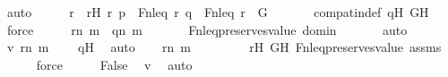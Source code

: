 \begin{isabellebody}
\ auto\isanewline
\ \ \isamarkupfalse%
\ \isamarkupfalse%
\ r\ \ rH{\isacharcolon}{\kern0pt}\ {\isachardoublequoteopen}{\isacharless}{\kern0pt}r{\isacharcomma}{\kern0pt}\ p{\isachargreater}{\kern0pt}\ {\isasymin}\ Fn{\isacharunderscore}{\kern0pt}leq{\isachardoublequoteclose}\ {\isachardoublequoteopen}{\isacharless}{\kern0pt}r{\isacharcomma}{\kern0pt}\ q{\isachargreater}{\kern0pt}\ {\isasymin}\ Fn{\isacharunderscore}{\kern0pt}leq{\isachardoublequoteclose}\ {\isachardoublequoteopen}r\ {\isasymin}\ G{\isachardoublequoteclose}\ \isanewline
\ \ \ \ \isamarkupfalse%
\ compat{\isacharunderscore}{\kern0pt}in{\isacharunderscore}{\kern0pt}def\ qH\ GH\ \isamarkupfalse%
\ force\isanewline
\ \ \isamarkupfalse%
\ \isamarkupfalse%
\ {\isachardoublequoteopen}r{\isacharbackquote}{\kern0pt}{\isacharless}{\kern0pt}n{\isacharcomma}{\kern0pt}\ m{\isachargreater}{\kern0pt}\ {\isacharequal}{\kern0pt}\ q{\isacharbackquote}{\kern0pt}{\isacharless}{\kern0pt}n{\isacharcomma}{\kern0pt}\ m{\isachargreater}{\kern0pt}{\isachardoublequoteclose}\ \isanewline
\ \ \ \ \isamarkupfalse%
\ Fn{\isacharunderscore}{\kern0pt}leq{\isacharunderscore}{\kern0pt}preserves{\isacharunderscore}{\kern0pt}value\ domin\ \isanewline
\ \ \ \ \isamarkupfalse%
\ auto\isanewline
\ \ \isamarkupfalse%
\ \isamarkupfalse%
\ v{}{\isacharcolon}{\kern0pt}\ {\isachardoublequoteopen}r{\isacharbackquote}{\kern0pt}{\isacharless}{\kern0pt}n{\isacharcomma}{\kern0pt}\ m{\isachargreater}{\kern0pt}\ {\isacharequal}{\kern0pt}\ {}{\isachardoublequoteclose}\ \isamarkupfalse%
\ qH\ \isamarkupfalse%
\ auto\isanewline
\isanewline
\ \ \isamarkupfalse%
\ {\isachardoublequoteopen}r{\isacharbackquote}{\kern0pt}{\isacharless}{\kern0pt}n{\isacharcomma}{\kern0pt}\ m{\isachargreater}{\kern0pt}\ {\isacharequal}{\kern0pt}\ {}{\isachardoublequoteclose}\ \isanewline
\ \ \ \ \isamarkupfalse%
\ rH\ GH\ Fn{\isacharunderscore}{\kern0pt}leq{\isacharunderscore}{\kern0pt}preserves{\isacharunderscore}{\kern0pt}value\ assms\isanewline
\ \ \ \ \isamarkupfalse%
\ force\isanewline
\ \ \isamarkupfalse%
\ \isamarkupfalse%
\ {\isachardoublequoteopen}False{\isachardoublequoteclose}\ \isamarkupfalse%
\ v{}\ \isamarkupfalse%
\ auto\isanewline
{}\isamarkupfalse%
%
\endisatagproof

\end{isabellebody}
